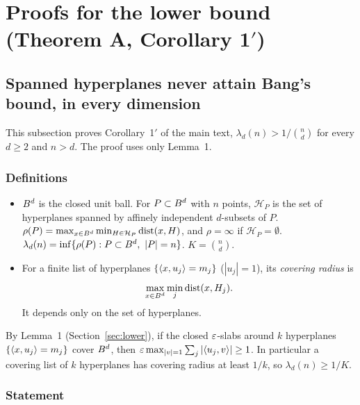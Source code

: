 \section{Proofs for the lower bound (Theorem A, Corollary 1$'$)}
\label{app:A}

\newcommand{\Abb}{\bar\beta}
\newcommand{\AH}{\mathcal{H}}
\newcommand{\AI}{\mathcal{I}}
\newcommand{\Aone}{\mathbf{1}}
\newcommand{\Adep}{\#\mathrm{dep}}

\subsection{Spanned hyperplanes never attain Bang's bound, in every dimension}
\label{sec:A-strict}

This subsection proves Corollary~1$'$ of the main text, $\lambda_d(n) > 1/\binom nd$ for every
$d \ge 2$ and $n > d$. The proof uses only Lemma~1.

\subsubsection*{Definitions}

\begin{itemize}
  \item $B^d$ is the closed unit ball. For $P \subset B^d$ with $n$ points, $\AH_P$ is the
    set of hyperplanes spanned by affinely independent $d$-subsets of $P$.
    $\rho(P) = \max_{x \in \ball^d} \min_{H \in \AH_P} \dist(x, H)$, and $\rho = \infty$ if
    $\AH_P = \emptyset$. $\lambda_d(n) = \inf\{\rho(P) : P \subset B^d,\ |P| = n\}$.
    $K = \binom{n}{d}$.
  \item For a finite list of hyperplanes $\{\langle x,u_j\rangle = m_j\}$ ($|u_j| = 1$), its
    \emph{covering radius} is
    \begin{equation*}
      \max_{x \in B^d} \min_j \operatorname{dist}(x, H_j).
    \end{equation*}
    It depends only on the set of hyperplanes.
\end{itemize}

By Lemma~1 (Section~\ref{sec:lower}), if the closed $\varepsilon$-slabs around $k$ hyperplanes
$\{\langle x,u_j\rangle = m_j\}$ cover $B^d$, then $\varepsilon \max_{|v|=1}\sum_j|\langle u_j,v\rangle| \ge 1$. In particular a covering list of $k$ hyperplanes has covering radius at least $1/k$, so
$\lambda_d(n) \ge 1/K$.

\subsubsection*{Statement}

